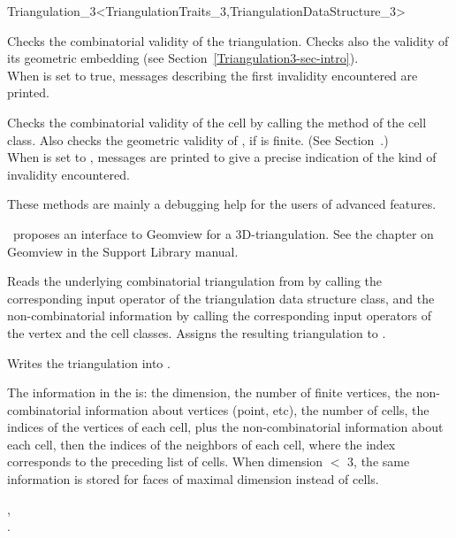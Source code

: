 \begin{ccRefClass}{Triangulation_3<TriangulationTraits_3,TriangulationDataStructure_3>}
\begin{ccAdvanced}
{Checks the combinatorial validity of the triangulation. Checks also the
validity of its geometric embedding (see
Section~\ref{Triangulation3-sec-intro}).\\ When  is set to true, 
messages describing the first invalidity encountered are printed.}

{Checks the combinatorial validity of the cell by calling the
 method of the  cell class. Also checks the
geometric validity of , if  is finite. (See
Section~\pageref{Triangulation3-sec-intro}.)\\ 
When  is set to , messages are printed to give
a precise indication of the kind of invalidity encountered.}

These methods are mainly a debugging help for the users of advanced features.

\end{ccAdvanced}


\cgal\ proposes an interface to Geomview for a 3D-triangulation. 
See the chapter on Geomview in the Support Library manual.

{Reads the underlying combinatorial triangulation from  by
calling the corresponding input operator of the triangulation data
structure class, and the non-combinatorial information by calling the
corresponding input operators of the vertex and the cell
classes. Assigns the resulting triangulation to .}

{Writes the triangulation  into .}

The information in the  is: the dimension, the number of
finite vertices, the non-combinatorial information about vertices (point,
etc), the number of cells, the indices of the vertices of each cell,
plus the non-combinatorial information about each cell, 
then the indices of the neighbors of each cell, where the index
corresponds to the preceding list of cells. When dimension $<$ 3, the
same information is stored for faces of maximal dimension instead of
cells. 

\ccSeeAlso

,\\
.



\end{ccRefClass}

